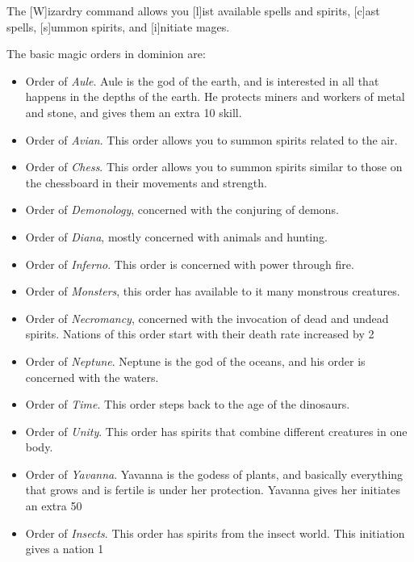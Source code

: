 The [W]izardry command allows you [l]ist available spells and spirits,
[c]ast spells, [s]ummon spirits, and [i]nitiate mages.

The basic magic orders in dominion are:

\begin{itemize}

\item
Order of \emph{Aule}.  Aule is the god of the earth, and is interested
in all that happens in the depths of the earth.  He protects miners
and workers of metal and stone, and gives them an extra 10%
skill.

\item
Order of \emph{Avian}.  This order allows you to summon spirits 
related to the air.

\item
Order of \emph{Chess}.  This order allows you to summon spirits
similar to those on the chessboard in their movements and strength.

\item
Order of \emph{Demonology}, concerned with the conjuring of demons.

\item
Order of \emph{Diana}, mostly concerned with animals and hunting.

\item
Order of \emph{Inferno}.  This order is concerned with power through
fire.

\item
Order of \emph{Monsters}, this order has available to it many
monstrous creatures.

\item
Order of \emph{Necromancy}, concerned with the invocation of dead and
undead spirits.  Nations of this order start with their death rate
increased by 2%

\item
Order of \emph{Neptune}.  Neptune is the god of the oceans, and his
order is concerned with the waters.

\item
Order of \emph{Time}.  This order steps back to the age of the
dinosaurs.

\item
Order of \emph{Unity}.  This order has spirits that combine different
creatures in one body.

\item
Order of \emph{Yavanna}.  Yavanna is the godess of plants, and
basically everything that grows and is fertile is under her
protection.  Yavanna gives her initiates an extra 50%

\item
Order of \emph{Insects}.  This order has spirits from the insect
world.  This initiation gives a nation 1%

\end{itemize}

